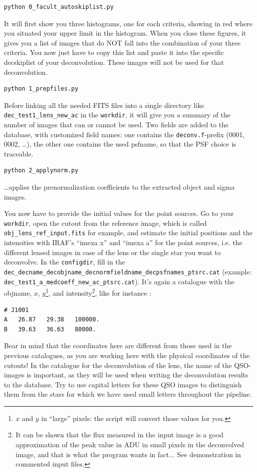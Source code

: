 \begin{Verbatim}
python 0_facult_autoskiplist.py
\end{Verbatim}

It will first show you three histograms, one for each criteria, showing in red where you situated your upper limit in the histogram. When you close these figures, it gives you a list of images that do NOT fall into the combination of your three criteria. You now just have to copy this list and paste it into the specific decskiplist of your deconvolution. These images will not be used for that deconvolution.

\begin{Verbatim}
python 1_prepfiles.py
\end{Verbatim}
Before linking all the needed FITS files into a single directory like \verb+dec_test1_lens_new_ac+ in the \verb+workdir+, it will give you a summary of the number of images that can or cannot be used. Two fields are added to the database, with customized field names: one contains the \verb+deconv.f+-prefix (0001, 0002, \ldots), the other one contains the used psfname, so that the PSF choice is traceable.


\begin{Verbatim}
python 2_applynorm.py
\end{Verbatim}
\ldots applies the prenormalization coefficients to the extracted object and sigma images.

You now have to provide the initial values for the point sources. Go to your \verb+workdir+, open the cutout from the reference image, which is called \verb+obj_lens_ref_input.fits+ for example, and estimate the initial positions and the intensities with IRAF's ``imexa x'' and ``imexa a'' for the point sources, i.e. the different lensed images in case of the lens or the single star you want to deconvolve. In the \verb+configdir+, fill in the \verb+dec_decname_decobjname_decnormfieldname_decpsfnames_ptsrc.cat+ (example: \verb+dec_test1_a_medcoeff_new_ac_ptsrc.cat+). It's again a catalogue with the objname, $x$, $y$\footnote{$x$ and $y$ in ``large'' pixels: the script will convert those values for you.}, and intensity\footnote{It can be shown that the flux measured in the input image is a good approximation of the peak value in ADU in small pixels in the deconvolved image, and that is what the program wants in fact... See demonstration in commented input files.}, like for instance :

\begin{Verbatim}[fontsize=\relsize{-2}]
# J1001
A	26.87	29.38	100000.
B	39.63	36.63	80000.
\end{Verbatim}
Bear in mind that the coordinates here are different from those used in the previous catalogues, as you are working here with the physical coordinates of the cutouts! In the catalogue for the deconvolution of the lens, the name of the QSO-images is important, as they will be used when writing the deconvolution results to the database. Try to use capital letters for these QSO images to distinguish them from the stars for which we have used small letters throughout the pipeline.

